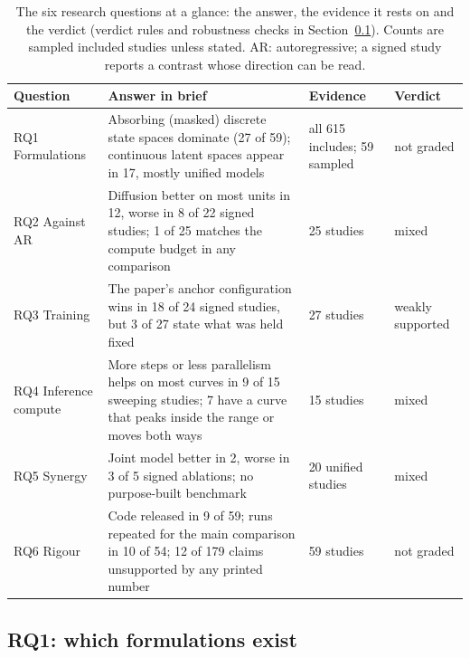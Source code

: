 \begin{table}[t]
\caption{The six research questions at a glance: the answer, the evidence it rests on and the verdict (verdict rules and robustness checks in Section~\ref{sec:rq1}). Counts are sampled included studies unless stated. AR: autoregressive; a signed study reports a contrast whose direction can be read.}
\label{tab:rq-summary}
\footnotesize
\begin{tabular}{@{}p{1.9cm}p{7.6cm}p{2.0cm}p{1.6cm}@{}}
\toprule
Question & Answer in brief & Evidence & Verdict \\
\midrule
RQ1 Formulations & Absorbing (masked) discrete state spaces dominate (27 of 59); continuous latent spaces appear in 17, mostly unified models & all 615 includes; 59 sampled & not graded \\
RQ2 Against AR & Diffusion better on most units in 12, worse in 8 of 22 signed studies; 1 of 25 matches the compute budget in any comparison & 25 studies & mixed \\
RQ3 Training & The paper's anchor configuration wins in 18 of 24 signed studies, but 3 of 27 state what was held fixed & 27 studies & weakly supported \\
RQ4 Inference compute & More steps or less parallelism helps on most curves in 9 of 15 sweeping studies; 7 have a curve that peaks inside the range or moves both ways & 15 studies & mixed \\
RQ5 Synergy & Joint model better in 2, worse in 3 of 5 signed ablations; no purpose-built benchmark & 20 unified studies & mixed \\
RQ6 Rigour & Code released in 9 of 59; runs repeated for the main comparison in 10 of 54; 12 of 179 claims unsupported by any printed number & 59 studies & not graded \\
\bottomrule
\end{tabular}
\end{table}

\subsection{RQ1: which formulations exist}
\label{sec:rq1}


